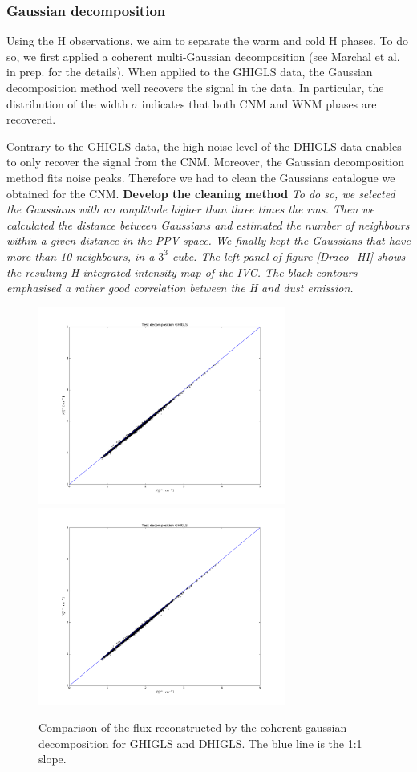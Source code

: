 \documentclass[traditabstract]{aa}
\begin{document}
\subsubsection{Gaussian decomposition}
Using the H observations, we aim to separate the warm and cold H phases. To do so, we first applied a coherent 
multi-Gaussian decomposition (see Marchal et al. in prep. for the details). 
When applied to the GHIGLS data, the Gaussian decomposition method well recovers the signal in the data. 
In particular, the distribution of the width $\sigma$ indicates that both CNM and WNM phases are recovered.

Contrary to the GHIGLS data, the high noise level of the DHIGLS data enables to only recover the signal from the CNM. 
Moreover, the Gaussian decomposition method fits noise peaks. Therefore we had to clean the Gaussians catalogue we obtained 
for the CNM. \textbf{Develop the cleaning method}
\textit{To do so, we selected the Gaussians with an amplitude higher than three times the rms. 
Then we calculated the distance between Gaussians and estimated the number of neighbours within a given distance in the PPV space. 
We finally kept the Gaussians that have more than 10 neighbours, in a $3^3$ cube. The left panel of figure \ref{Draco_HI} shows 
the resulting H integrated intensity map of the IVC. The black contours emphasised a rather good correlation between 
the H and dust emission.}

\begin{figure}[h]
  \centering
  \includegraphics[page=1,height=6.5cm,trim=10 55 60 90,clip=true]{Figures/Test_decomposition.pdf}
  \hspace{3mm}
  \includegraphics[page=3,height=6.5cm,trim=10 55 60 90,clip=true]{Figures/Test_decomposition.pdf}
  \caption{Comparison of the flux reconstructed by the coherent gaussian decomposition for GHIGLS and DHIGLS. The blue line is the 
    1:1 slope.}
\end{figure}
\end{document}
